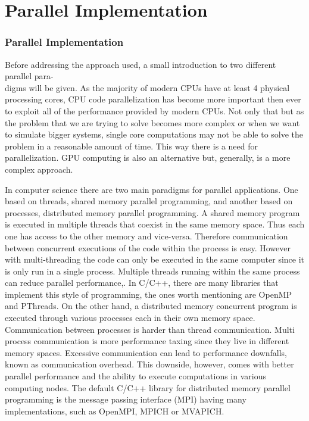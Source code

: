 \chapter{Parallel Implementation}

\subsection{Parallel Implementation}

	Before addressing the approach used, a small introduction to two different parallel para-\\digms will be given. As the majority of modern CPUs have at least 4 physical processing cores, CPU code parallelization has become more important then ever to exploit all of the performance provided by modern CPUs. Not only that but as the problem that we are trying to solve becomes more complex or when we want to simulate bigger systems, single core computations may not be able to solve the problem in a reasonable amount of time. This way there is a need for parallelization. GPU computing is also an alternative but, generally, is a more complex approach.
	
	
	In computer science there are two main paradigms for parallel applications. One based on threads, shared memory parallel programming, and another based on processes, distributed memory parallel programming. 
A shared memory program is executed in multiple threads that coexist in the same memory space. Thus each one has access to the other memory and vice-versa. Therefore communication between concurrent executions of the code within the process is easy. However with multi-threading the code can only be executed in the same computer since it is only run in a single process. Multiple threads running within the same process can reduce parallel performance,. In C/C++, there are many libraries that implement this style of programming, the ones worth mentioning are OpenMP and PThreads. 
On the other hand, a distributed memory concurrent program is executed through various processes each in their own memory space. Communication between processes is harder than thread communication. Multi process communication is more performance taxing since they live in different memory spaces. Excessive communication can lead to performance downfalls, known as communication overhead. This downside, however, comes with better parallel performance and the ability to execute computations in various computing nodes. The default C/C++ library for distributed memory parallel programming is the message passing interface (MPI) having many implementations, such as OpenMPI, MPICH or MVAPICH.
 
